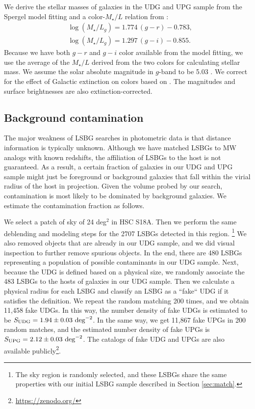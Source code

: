 \documentclass[twocolumn,astrosymb,twocolappendix]{aastex631}
\begin{document}
\begin{CJK*}{UTF8}{gbsn}
We derive the stellar masses of galaxies in the UDG and UPG sample from the Spergel model fitting and a color-$M_{\star}/L$ relation from \citet{Into2013}:
\begin{align*}
&\log \left(M_{\star} / L_{g}\right)=1.774\,(g-r)-0.783, \\
&\log \left(M_{\star} / L_{g}\right)=1.297\,(g-i)-0.855.
\end{align*}
Because we have both $g-r$ and $g-i$ color available from the model fitting, we use the average of the $M_{\star}/L$ derived from the two colors for calculating stellar mass. We assume the solar absolute magnitude in $g$-band to be 5.03 \citep{Willmer2018}. We correct for the effect of Galactic extinction on colors based on \citet{SFD1998,Schlafly2011}. The magnitudes and surface brightnesses are also extinction-corrected. 


\subsection{Background contamination}\label{sec:bkg}
The major weakness of LSBG searches in photometric data is that distance information is typically unknown. Although we have matched LSBGs to MW analogs with known redshifts, the affiliation of LSBGs to the host is not guaranteed. As a result, a certain fraction of galaxies in our UDG and UPG sample might just be foreground or background galaxies that fall within the virial radius of the host in projection. Given the volume probed by our search, contamination is most likely to be dominated by background galaxies. We estimate the contamination fraction as follows.

We select a patch of sky of 24 deg$^{2}$ in HSC S18A. Then we perform the same deblending and modeling steps for the 2707 LSBGs detected in this region. \footnote{The sky region is randomly selected, and these LSBGs share the same properties with our initial LSBG sample described in Section \ref{sec:match}.} We also removed objects that are already in our UDG sample, and we did visual inspection to further remove spurious objects. In the end, there are 480 LSBGs representing a population of possible contaminants in our UDG sample. Next, because the UDG is defined based on a physical size, we randomly associate the 483 LSBGs to the hosts of galaxies in our UDG sample. Then we calculate a physical radius for each LSBG and classify an LSBG as a ``fake`` UDG if it satisfies the definition. We repeat the random matching 200 times, and we obtain 11,458 fake UDGs. In this way, the number density of fake UDGs is estimated to be $S_{\rm UDG} = 1.94\pm0.03\ \mathrm{deg}^{-2}$. In the same way, we get 11,867 fake UPGs in 200 random matches, and the estimated number density of fake UPGs is $S_{\rm UPG} = 2.12\pm0.03\ \mathrm{deg}^{-2}$. The catalogs of fake UDG and UPGs are also available publicly\footnote{\url{https://zenodo.org/}}.


\end{CJK*}
\end{document}
